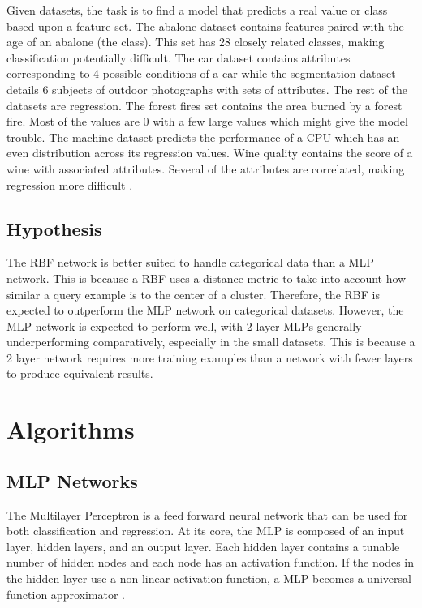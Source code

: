 \documentclass[twoside,10pt]{article}
\begin{document}
Given datasets, the task is to find a model that predicts a real value or class based upon a feature set. The abalone dataset contains features paired with the age of an abalone (the class). This set has 28 closely related classes, making classification potentially difficult.
The car dataset contains attributes corresponding to 4 possible conditions of a car while the segmentation dataset details 6 subjects of outdoor photographs with sets of attributes.
The rest of the datasets are regression.
The forest fires set contains the area burned by a forest fire. Most of the values are 0 with a few large values which might give the model trouble.
The machine dataset predicts the performance of a CPU which has an even distribution across its regression values. Wine quality contains the score of a wine with associated attributes. Several of the attributes are correlated, making regression more difficult \citep{datasets}.

\subsection{Hypothesis}

The RBF network is better suited to handle categorical data than a MLP network. This is because a RBF uses a distance metric to take into account how similar a query example is to the center of a cluster.
Therefore, the RBF is expected to outperform the MLP network on categorical datasets.
However, the MLP network is expected to perform well, with 2 layer MLPs generally underperforming comparatively, especially in the small datasets. This is because a 2 layer network requires more training examples than a network with fewer layers to produce equivalent results.

\section{Algorithms}

\subsection{MLP Networks}
The Multilayer Perceptron is a feed forward neural network that can be used for both classification and regression.
At its core, the MLP is composed of an input layer, hidden layers, and an output layer. Each hidden layer contains a tunable number of hidden nodes and each node has an activation function. If the nodes in the hidden layer use a non-linear activation function, a MLP becomes a universal function approximator \citep{svozil1997ffnn}.
\end{document}
